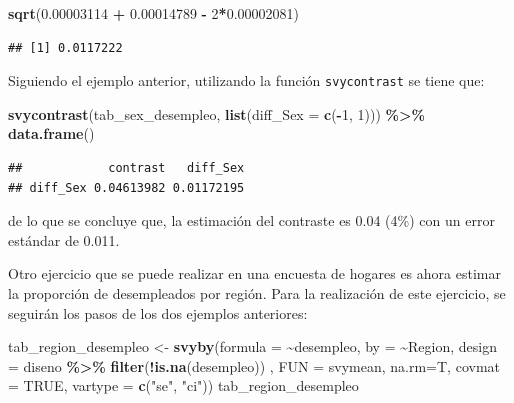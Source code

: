 \documentclass[
  spanish,
  12pt,
]{book}
\newenvironment{Shaded}{\begin{snugshade}}{\end{snugshade}}
\newcommand{\AttributeTok}[1]{\textcolor[rgb]{0.13,0.29,0.53}{#1}}
\newcommand{\ConstantTok}[1]{\textcolor[rgb]{0.56,0.35,0.01}{#1}}
\newcommand{\DecValTok}[1]{\textcolor[rgb]{0.00,0.00,0.81}{#1}}
\newcommand{\FloatTok}[1]{\textcolor[rgb]{0.00,0.00,0.81}{#1}}
\newcommand{\FunctionTok}[1]{\textcolor[rgb]{0.13,0.29,0.53}{\textbf{#1}}}
\newcommand{\NormalTok}[1]{#1}
\newcommand{\OtherTok}[1]{\textcolor[rgb]{0.56,0.35,0.01}{#1}}
\newcommand{\SpecialCharTok}[1]{\textcolor[rgb]{0.81,0.36,0.00}{\textbf{#1}}}
\newcommand{\StringTok}[1]{\textcolor[rgb]{0.31,0.60,0.02}{#1}}
\begin{document}
\begin{Shaded}
\begin{Highlighting}[]
\FunctionTok{sqrt}\NormalTok{(}\FloatTok{0.00003114}  \SpecialCharTok{+} \FloatTok{0.00014789} \SpecialCharTok{{-}} \DecValTok{2}\SpecialCharTok{*}\FloatTok{0.00002081}\NormalTok{)}
\end{Highlighting}
\end{Shaded}

\begin{verbatim}
## [1] 0.0117222
\end{verbatim}

Siguiendo el ejemplo anterior, utilizando la función \texttt{svycontrast} se tiene que:

\begin{Shaded}
\begin{Highlighting}[]
\FunctionTok{svycontrast}\NormalTok{(tab\_sex\_desempleo,}
            \FunctionTok{list}\NormalTok{(}\AttributeTok{diff\_Sex =} \FunctionTok{c}\NormalTok{(}\SpecialCharTok{{-}}\DecValTok{1}\NormalTok{, }\DecValTok{1}\NormalTok{))) }\SpecialCharTok{\%\textgreater{}\%}
  \FunctionTok{data.frame}\NormalTok{()}
\end{Highlighting}
\end{Shaded}

\begin{verbatim}
##            contrast   diff_Sex
## diff_Sex 0.04613982 0.01172195
\end{verbatim}

de lo que se concluye que, la estimación del contraste es 0.04 (4\%) con un error estándar de 0.011.

Otro ejercicio que se puede realizar en una encuesta de hogares es ahora estimar la proporción de desempleados por región. Para la realización de este ejercicio, se seguirán los pasos de los dos ejemplos anteriores:

\begin{Shaded}
\begin{Highlighting}[]
\NormalTok{tab\_region\_desempleo }\OtherTok{\textless{}{-}} \FunctionTok{svyby}\NormalTok{(}\AttributeTok{formula =}  \SpecialCharTok{\textasciitilde{}}\NormalTok{desempleo, }\AttributeTok{by =} \SpecialCharTok{\textasciitilde{}}\NormalTok{Region, }
                              \AttributeTok{design  =}\NormalTok{ diseno }\SpecialCharTok{\%\textgreater{}\%} \FunctionTok{filter}\NormalTok{(}\SpecialCharTok{!}\FunctionTok{is.na}\NormalTok{(desempleo)) , }
                              \AttributeTok{FUN     =}\NormalTok{ svymean, }\AttributeTok{na.rm=}\NormalTok{T, }\AttributeTok{covmat =} \ConstantTok{TRUE}\NormalTok{,}
                              \AttributeTok{vartype =} \FunctionTok{c}\NormalTok{(}\StringTok{"se"}\NormalTok{, }\StringTok{"ci"}\NormalTok{))}
\NormalTok{tab\_region\_desempleo}
\end{Highlighting}
\end{Shaded}
\end{document}
